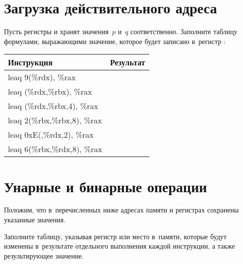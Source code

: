 \section{Загрузка действительного адреса}
Пусть регистры  и  хранят значения~\(p\) и~\(q\) соответственно. Заполните таблицу формулами, выражающими значение, которое будет записано в~регистр :

\begin{flushleft}\newcommand*{\ans}{\ansfw{2.0cm}}\ttfamily\small\begin{tabular}{@{}ll@{}}
  \textrm{Инструкция} & \textrm{Результат} \\
  \midrule
  leaq 9(\%rdx), \%rax         & \ans{\(9 + q\)} \\
  leaq (\%rdx,\%rbx), \%rax    & \ans{\(q + p\)} \\
  leaq (\%rdx,\%rbx,4), \%rax  & \ans{\(q + 4p\)} \\
  leaq 2(\%rbx,\%rbx,8), \%rax & \ans{\(2 + 9p\)} \\
  leaq 0xE(,\%rdx,2), \%rax    & \ans{\(14 + 2q\)} \\
  leaq 6(\%rbx,\%rdx,8), \%rax & \ans{\(6 + p + 8q\)} \\
\end{tabular}\end{flushleft}



\section{Унарные и бинарные операции}
Положим, что в~перечисленных ниже адресах памяти и регистрах сохранены указанные значения.

Заполните таблицу, указывая регистр или место в~памяти, которые будут изменены в~результате отдельного выполнения каждой инструкции, а также результирующее значение.

